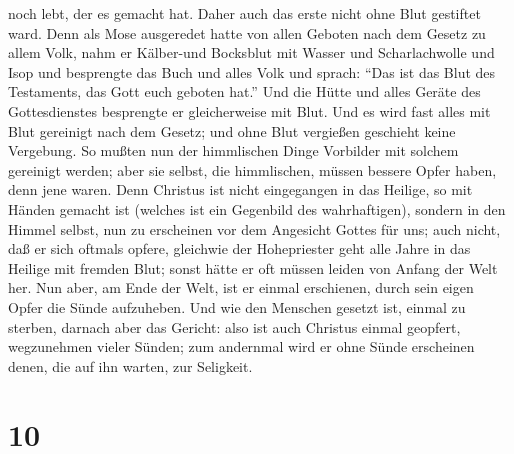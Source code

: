 noch lebt, der es gemacht hat.  Daher auch das erste nicht
ohne Blut gestiftet ward.  Denn als Mose ausgeredet hatte
von allen Geboten nach dem Gesetz zu allem Volk, nahm er Kälber-und
Bocksblut mit Wasser und Scharlachwolle und Isop und besprengte das Buch
und alles Volk  und sprach: ``Das ist das Blut des
Testaments, das Gott euch geboten hat.''  Und die Hütte und
alles Geräte des Gottesdienstes besprengte er gleicherweise mit Blut.
 Und es wird fast alles mit Blut gereinigt nach dem Gesetz;
und ohne Blut vergießen geschieht keine Vergebung.  So
mußten nun der himmlischen Dinge Vorbilder mit solchem gereinigt werden;
aber sie selbst, die himmlischen, müssen bessere Opfer haben, denn jene
waren.  Denn Christus ist nicht eingegangen in das Heilige,
so mit Händen gemacht ist (welches ist ein Gegenbild des wahrhaftigen),
sondern in den Himmel selbst, nun zu erscheinen vor dem Angesicht Gottes
für uns;  auch nicht, daß er sich oftmals opfere, gleichwie
der Hohepriester geht alle Jahre in das Heilige mit fremden Blut;
 sonst hätte er oft müssen leiden von Anfang der Welt her.
Nun aber, am Ende der Welt, ist er einmal erschienen, durch sein eigen
Opfer die Sünde aufzuheben.  Und wie den Menschen gesetzt
ist, einmal zu sterben, darnach aber das Gericht:  also ist
auch Christus einmal geopfert, wegzunehmen vieler Sünden; zum andernmal
wird er ohne Sünde erscheinen denen, die auf ihn warten, zur Seligkeit.

\hypertarget{section-9}{%
\section{10}\label{section-9}}

